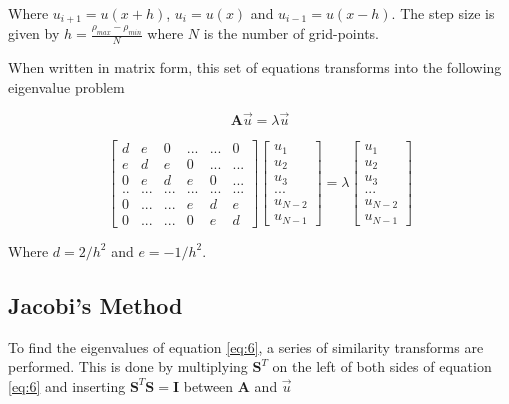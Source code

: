 \documentclass[a4paper,11pt]{article}
\begin{document}
Where $u_{i+1} = u(x+h)$, $u_i = u(x)$ and $u_{i-1}=u(x-h)$. The step size is given by $h = \frac{\rho_{max}-\rho_{min}}{N}$ where $N$ is the number of grid-points. 

When written in matrix form, this set of equations transforms into the following eigenvalue problem 

\begin{equation}\label{eq:6}
   \mathbf{A}\vec{u} = \lambda\vec{u} 
\end{equation}

\begin{equation}\label{eq:7}
    \begin{bmatrix}
    d & e & 0 & ... & ... & 0 \\
    e & d & e & 0 & ... & ... \\
    0 & e & d & e & 0 & ... \\
   .. & ... & ... & ... & ... & ... \\
    0 & ... &...& e & d & e \\
    0 & ... &...& 0 & e & d
    \end{bmatrix}
    \begin{bmatrix}

    u_1 \\ 
    u_2 \\ 
    u_3\\
    ... \\ 
    u_{N-2} \\ 
    u_{N-1}
    \end{bmatrix}
    = 
    \lambda
    \begin{bmatrix}
     u_1 \\ 
    u_2 \\ 
    u_3\\
    ... \\ 
    u_{N-2} \\ 
    u_{N-1}
    \end{bmatrix}
\end{equation}

Where $d = 2/h^2$ and $e = -1/h^2$. 

\subsection{Jacobi's Method}

To find the eigenvalues of equation \ref{eq:6}, a series of similarity transforms are performed. This is done by multiplying $\mathbf{S}^T$ on the left of both sides of equation \ref{eq:6} and inserting $\mathbf{S}^T \mathbf S = \mathbf I$ between $\mathbf{A}$ and $\vec{u}$
\end{document}
